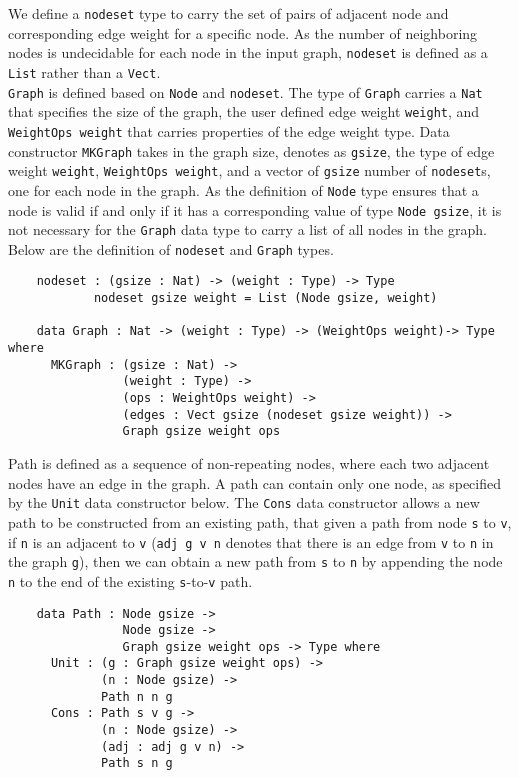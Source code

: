 We define a \texttt{nodeset} type to carry the set of pairs of adjacent node and corresponding edge weight for a specific node. As the number of neighboring nodes is undecidable for each node in the input graph, \texttt{nodeset} is defined as a \texttt{List} rather than a \texttt{Vect}. 
\\
\texttt{Graph} is defined based on \texttt{Node} and \texttt{nodeset}. The type of \texttt{Graph} carries a \texttt{Nat} that specifies the size of the graph, the user defined edge weight \texttt{weight}, and \texttt{WeightOps weight} that carries properties of the edge weight type. Data constructor \texttt{MKGraph} takes in the graph size, denotes as \texttt{gsize}, the type of edge weight \texttt{weight}, \texttt{WeightOps weight}, and a vector of \texttt{gsize} number of \texttt{nodeset}s, one for each node in the graph. As the definition of \texttt{Node} type ensures that a node is valid if and only if it has a corresponding value of type \texttt{Node gsize}, it is not necessary for the \texttt{Graph} data type to carry a list of all nodes in the graph. Below are the definition of \texttt{nodeset} and \texttt{Graph} types. 

\begin{lstlisting}
	nodeset : (gsize : Nat) -> (weight : Type) -> Type
			nodeset gsize weight = List (Node gsize, weight)

	data Graph : Nat -> (weight : Type) -> (WeightOps weight)-> Type where
	  MKGraph : (gsize : Nat) ->
	            (weight : Type) ->
	            (ops : WeightOps weight) ->
	            (edges : Vect gsize (nodeset gsize weight)) ->
	            Graph gsize weight ops
\end{lstlisting}

Path is defined as a sequence of non-repeating nodes, where each two adjacent nodes have an edge in the graph. A path can contain only one node, as specified by the \texttt{Unit} data constructor below. The \texttt{Cons} data constructor allows a new path to be constructed from an existing path, that given a path from node \texttt{s} to \texttt{v}, if \texttt{n} is an adjacent to \texttt{v} (\texttt{adj g v n} denotes that there is an edge from \texttt{v} to \texttt{n} in the graph \texttt{g}), then we can obtain a new path from \texttt{s} to \texttt{n} by appending the node \texttt{n} to the end of the existing \texttt{s}-to-\texttt{v} path. 

\begin{lstlisting}
	data Path : Node gsize ->
	            Node gsize ->
	            Graph gsize weight ops -> Type where
	  Unit : (g : Graph gsize weight ops) ->
	         (n : Node gsize) ->
	         Path n n g
	  Cons : Path s v g ->
	         (n : Node gsize) ->
	         (adj : adj g v n) ->
	         Path s n g
\end{lstlisting}


